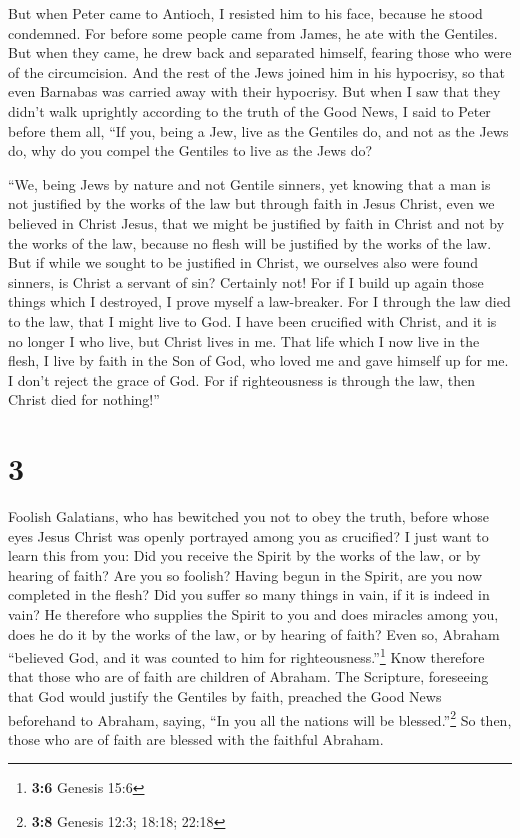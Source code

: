  But when Peter came to Antioch, I resisted him to his
face, because he stood condemned.  For before some people
came from James, he ate with the Gentiles. But when they came, he drew
back and separated himself, fearing those who were of the circumcision.
 And the rest of the Jews joined him in his hypocrisy, so
that even Barnabas was carried away with their hypocrisy.
 But when I saw that they didn't walk uprightly according
to the truth of the Good News, I said to Peter before them all, ``If
you, being a Jew, live as the Gentiles do, and not as the Jews do, why
do you compel the Gentiles to live as the Jews do?

 ``We, being Jews by nature and not Gentile sinners,
 yet knowing that a man is not justified by the works of
the law but through faith in Jesus Christ, even we believed in Christ
Jesus, that we might be justified by faith in Christ and not by the
works of the law, because no flesh will be justified by the works of the
law.  But if while we sought to be justified in Christ,
we ourselves also were found sinners, is Christ a servant of sin?
Certainly not!  For if I build up again those things
which I destroyed, I prove myself a law-breaker.  For I
through the law died to the law, that I might live to God.
 I have been crucified with Christ, and it is no longer I
who live, but Christ lives in me. That life which I now live in the
flesh, I live by faith in the Son of God, who loved me and gave himself
up for me.  I don't reject the grace of God. For if
righteousness is through the law, then Christ died for nothing!''

\hypertarget{section-2}{%
\section{3}\label{section-2}}

 Foolish Galatians, who has bewitched you not to obey the
truth, before whose eyes Jesus Christ was openly portrayed among you as
crucified?  I just want to learn this from you: Did you
receive the Spirit by the works of the law, or by hearing of faith?
 Are you so foolish? Having begun in the Spirit, are you
now completed in the flesh?  Did you suffer so many things
in vain, if it is indeed in vain?  He therefore who
supplies the Spirit to you and does miracles among you, does he do it by
the works of the law, or by hearing of faith?  Even so,
Abraham ``believed God, and it was counted to him for
righteousness.''\footnote{\textbf{3:6} Genesis 15:6}  Know
therefore that those who are of faith are children of Abraham.
 The Scripture, foreseeing that God would justify the
Gentiles by faith, preached the Good News beforehand to Abraham, saying,
``In you all the nations will be blessed.''\footnote{\textbf{3:8}
  Genesis 12:3; 18:18; 22:18}  So then, those who are of
faith are blessed with the faithful Abraham.

